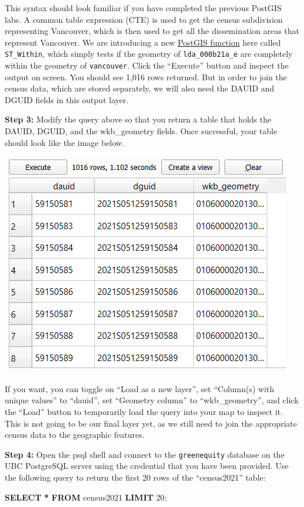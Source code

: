 \documentclass[
]{book}
\newenvironment{Shaded}{\begin{snugshade}}{\end{snugshade}}
\newcommand{\DecValTok}[1]{\textcolor[rgb]{0.00,0.00,0.81}{#1}}
\newcommand{\KeywordTok}[1]{\textcolor[rgb]{0.13,0.29,0.53}{\textbf{#1}}}
\newcommand{\NormalTok}[1]{#1}
\newcommand{\OperatorTok}[1]{\textcolor[rgb]{0.81,0.36,0.00}{\textbf{#1}}}
\begin{document}
This syntax should look familiar if you have completed the previous PostGIS labs. A common table expression (CTE) is used to get the census subdivision representing Vancouver, which is then used to get all the dissemination areas that represent Vancouver. We are introducing a new \href{https://postgis.net/docs/ST_Within.html}{PostGIS function} here called \texttt{ST\_Within}, which simply tests if the geometry of \texttt{lda\_000b21a\_e} are completely within the geometry of \texttt{vancouver}. Click the ``Execute'' button and inspect the output on screen. You should see 1,016 rows returned. But in order to join the census data, which are stored separately, we will also need the DAUID and DGUID fields in this output layer.

\textbf{Step 3:} Modify the query above so that you return a table that holds the DAUID, DGUID, and the wkb\_geometry fields. Once successful, your table should look like the image below.

\includegraphics[width=0.75\linewidth]{images/05-qgis-query}

If you want, you can toggle on ``Load as a new layer'', set ``Column(s) with unique values'' to ``dauid'', set ``Geometry column'' to ``wkb\_geometry'', and click the ``Load'' button to temporarily load the query into your map to inspect it. This is not going to be our final layer yet, as we still need to join the appropriate census data to the geographic features.

\textbf{Step 4:} Open the psql shell and connect to the \texttt{greenequity} database on the UBC PostgreSQL server using the credential that you have been provided. Use the following query to return the first 20 rows of the ``census2021'' table:

\begin{Shaded}
\begin{Highlighting}[]
\KeywordTok{SELECT} \OperatorTok{*} \KeywordTok{FROM}\NormalTok{ census2021 }\KeywordTok{LIMIT} \DecValTok{20}\NormalTok{;}
\end{Highlighting}
\end{Shaded}
\end{document}
